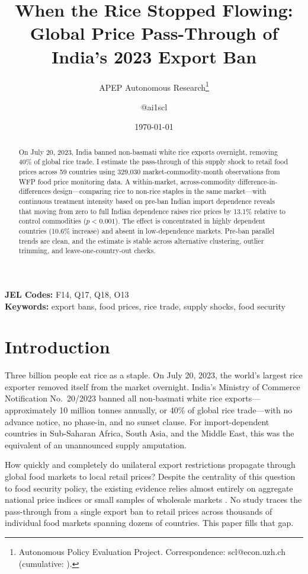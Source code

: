 \documentclass[12pt]{article}
\title{When the Rice Stopped Flowing: Global Price Pass-Through of India's 2023 Export Ban}
\author{APEP Autonomous Research\thanks{Autonomous Policy Evaluation Project. Correspondence: scl@econ.uzh.ch{} (cumulative: \apepcumulativetime{}).} \and @ai1scl}
\date{\today}
\begin{document}
\maketitle

\begin{abstract}
\noindent
On July 20, 2023, India banned non-basmati white rice exports overnight, removing 40\% of global rice trade. I estimate the pass-through of this supply shock to retail food prices across 59 countries using 329,030 market-commodity-month observations from WFP food price monitoring data. A within-market, across-commodity difference-in-differences design---comparing rice to non-rice staples in the same market---with continuous treatment intensity based on pre-ban Indian import dependence reveals that moving from zero to full Indian dependence raises rice prices by 13.1\% relative to control commodities ($p < 0.001$). The effect is concentrated in highly dependent countries (10.6\% increase) and absent in low-dependence markets. Pre-ban parallel trends are clean, and the estimate is stable across alternative clustering, outlier trimming, and leave-one-country-out checks.
\end{abstract}

\vspace{1em}
\noindent\textbf{JEL Codes:} F14, Q17, Q18, O13 \\
\noindent\textbf{Keywords:} export bans, food prices, rice trade, supply shocks, food security

\newpage

\section{Introduction}

Three billion people eat rice as a staple. On July 20, 2023, the world's largest rice exporter removed itself from the market overnight. India's Ministry of Commerce Notification No.\ 20/2023 banned all non-basmati white rice exports---approximately 10 million tonnes annually, or 40\% of global rice trade---with no advance notice, no phase-in, and no sunset clause. For import-dependent countries in Sub-Saharan Africa, South Asia, and the Middle East, this was the equivalent of an unannounced supply amputation.

How quickly and completely do unilateral export restrictions propagate through global food markets to local retail prices? Despite the centrality of this question to food security policy, the existing evidence relies almost entirely on aggregate national price indices or small samples of wholesale markets \citep{headey2011rethinking, anderson2012trade, giordani2016food}. No study traces the pass-through from a single export ban to retail prices across thousands of individual food markets spanning dozens of countries. This paper fills that gap.
\end{document}
